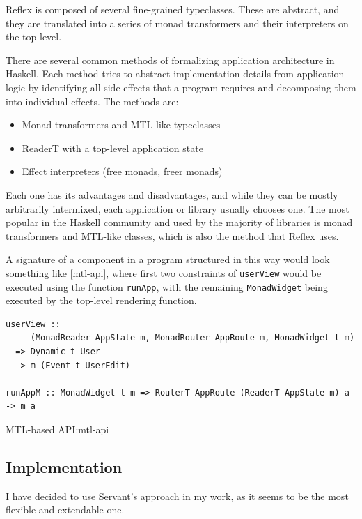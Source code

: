 \documentclass[english,odsaz]{fitthesis}
\begin{document}
Reflex is composed of several fine-grained typeclasses. These are abstract, and
they are translated into a series of monad transformers and their interpreters
on the top level.

There are several common methods of formalizing application architecture in
Haskell. Each method tries to abstract implementation details from application
logic by identifying all side-effects that a program requires and decomposing
them into individual effects. The methods are:

\begin{itemize}
\item Monad transformers and MTL-like typeclasses
\item ReaderT with a top-level application state
\item Effect interpreters (free monads, freer monads)
\end{itemize}

Each one has its advantages and disadvantages, and while they can be mostly
arbitrarily intermixed, each application or library usually chooses one. The
most popular in the Haskell community and used by the majority of libraries is
monad transformers and MTL-like classes, which is also the method that Reflex
uses.

A signature of a component in a program structured in this way would look
something like \ref{mtl-api}, where first two constraints of \texttt{userView} would be
executed using the function \texttt{runApp}, with the remaining \texttt{MonadWidget} being
executed by the top-level rendering function.

\begin{listing}[htbp]
\begin{verbatim}
userView ::
     (MonadReader AppState m, MonadRouter AppRoute m, MonadWidget t m)
  => Dynamic t User
  -> m (Event t UserEdit)

runAppM :: MonadWidget t m => RouterT AppRoute (ReaderT AppState m) a -> m a
\end{verbatim}
\caption{MTL-based API:mtl-api}
\end{listing}

\subsection{Implementation}
\label{sec:org59b5d42}

I have decided to use Servant's approach in my work, as it seems to be the most
flexible and extendable one.
\end{document}
